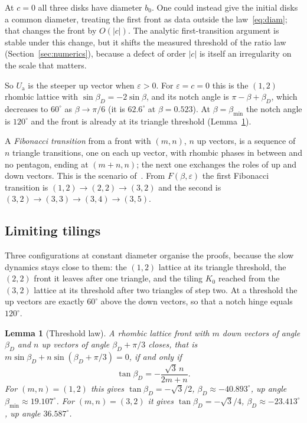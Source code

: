 \documentclass[11pt]{amsart}
\newtheorem{lemma}{Lemma}[section]
\theoremstyle{definition}
\newcommand{\eps}{\varepsilon}
\newcommand{\Ua}{U_{\mathrm a}}
\begin{document}
\noindent At $c=0$ all three disks have diameter $b_0$. One could instead give the initial disks a common
diameter, treating the first front as data outside the law~\eqref{eq:diam}; that changes the front by
$O(|c|)$. The analytic first-transition argument is stable under this change, but it shifts the measured threshold of the ratio law
(Section~\ref{sec:numerics}), because a defect of order $|c|$ is itself an irregularity on the scale that
matters.

So $\Ua$ is the steeper up vector when $\eps>0$. For $\eps=c=0$ this is the $(1,2)$ rhombic lattice with
$\sin\beta_D=-2\sin\beta$, and its notch angle is $\pi-\beta+\beta_D$, which decreases to $60^\circ$ as
$\beta\to\pi/6$ (it is $62.6^\circ$ at $\beta=0.523$). At $\beta=\beta_{\min}$ the notch angle is
$120^\circ$ and the front is already at its triangle threshold (Lemma~\ref{lem:threshold}).

A \emph{Fibonacci transition} from a front with $(m,n)$, $n$ up vectors, is a sequence of $n$ triangle
transitions, one on each up vector, with rhombic phases in between and no pentagon, ending at
$(m+n,n)$; the next one exchanges the roles of up and down vectors. This is the scenario of~\cite[p.~25]{GDD}.
From $F(\beta,\eps)$ the first Fibonacci transition is $(1,2)\to(2,2)\to(3,2)$ and the second is
$(3,2)\to(3,3)\to(3,4)\to(3,5)$.

\subsection{Limiting tilings}\label{sec:tilings} Three configurations at constant diameter organise the
proofs, because the slow dynamics stays close to them: the $(1,2)$ lattice at its triangle threshold, the
$(2,2)$ front it leaves after one triangle, and the tiling $K_0$ reached from the $(3,2)$ lattice at its
threshold after two triangles of step two. At a threshold the up vectors are exactly $60^\circ$ above the
down vectors, so that a notch hinge equals $120^\circ$.

\begin{lemma}[Threshold law]\label{lem:threshold}
A rhombic lattice front with $m$ down vectors of angle $\beta_D$ and $n$ up vectors of angle
$\beta_D+\pi/3$ closes, that is $m\sin\beta_D+n\sin(\beta_D+\pi/3)=0$, if and only if
\[
\tan\beta_D=-\frac{\sqrt3\,n}{2m+n}.
\]
For $(m,n)=(1,2)$ this gives $\tan\beta_D=-\sqrt3/2$, $\beta_D\approx-40.893^\circ$, up angle
$\beta_{\min}\approx19.107^\circ$. For $(m,n)=(3,2)$ it gives $\tan\beta_D=-\sqrt3/4$,
$\beta_D\approx-23.413^\circ$, up angle $36.587^\circ$.
\end{lemma}
\end{document}
